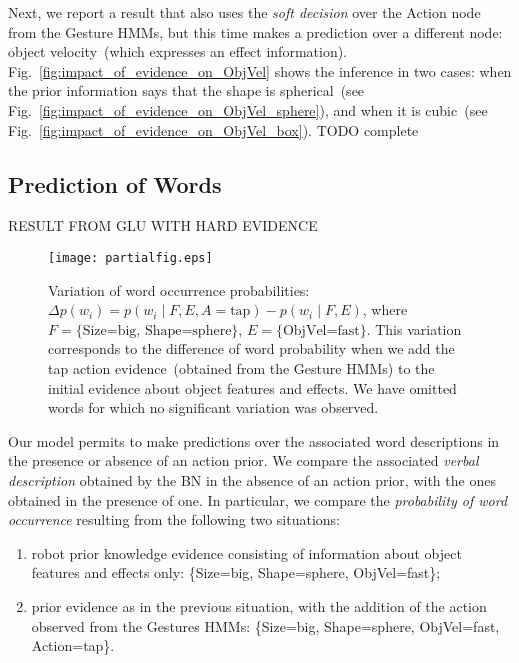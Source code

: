 Next, we report a result that also uses the \emph{soft decision} over the Action node from the Gesture \acp{HMM}, but this time makes a prediction over a different node: object velocity~(which expresses an effect information).
Fig.~\ref{fig:impact_of_evidence_on_ObjVel} shows the inference in two cases: when the prior information says that the shape is spherical~(see Fig.~\ref{fig:impact_of_evidence_on_ObjVel_sphere}), and when it is cubic~(see Fig.~\ref{fig:impact_of_evidence_on_ObjVel_box}).
TODO complete

\subsection{Prediction of Words}

RESULT FROM GLU WITH HARD EVIDENCE

\begin{figure}
\centering
\texttt{[image: partialfig.eps]}
\caption{Variation of word occurrence probabilities: $\Delta p(w_i) = p(w_i \mid F, E, A=\text{tap}) - p(w_i \mid F,E)$, where $F = \{\text{Size=big, Shape=sphere}\}$, $E = \{\text{ObjVel=fast}\}$. This variation corresponds to the difference of word probability when we add the tap action evidence~(obtained from the Gesture \acp{HMM}) to the initial evidence about object features and effects. We have omitted words for which no significant variation was observed.}
\label{fig:probdiff}
\end{figure}

Our model permits to make predictions over the associated word descriptions in the presence or absence of an action prior.
We compare the associated \emph{verbal description} obtained by the \acl{BN} in the absence of an action prior, with the ones obtained in the presence of one.
In particular, we compare the \emph{probability of word occurrence} resulting from the following two situations:
\begin{enumerate}
\item robot prior knowledge evidence consisting of information about object features and effects only: %
\{Size=big, Shape=sphere, ObjVel=fast\};

\item prior evidence as in the previous situation, with the addition of the action observed from the Gestures \acp{HMM}: %
\{Size=big, Shape=sphere, ObjVel=fast, Action=tap\}.
\end{enumerate}

